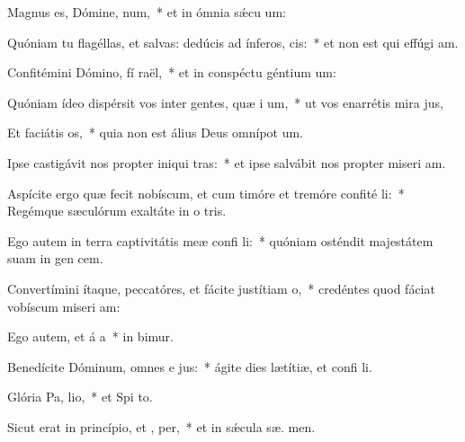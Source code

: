 \item Magnus es, Dómine,  num,~* et in ómnia sǽcu  um:
\item Quóniam tu flagéllas, et salvas: dedúcis ad ínferos,  cis:~* et non est qui effúgi  am.
\item Confitémini Dómino, fí raël,~* et in conspéctu géntium  um:
\item Quóniam ídeo dispérsit vos inter gentes, quæ i um,~* ut vos enarrétis mira jus,
\item Et faciátis  os,~* quia non est álius Deus omnípot  um.
\item Ipse castigávit nos propter iniqui tras:~* et ipse salvábit nos propter miseri am.
\item Aspícite ergo quæ fecit nobíscum, et cum timóre et tremóre confité li:~* Regémque sæculórum exaltáte in o tris.
\item Ego autem in terra captivitátis meæ confi li:~* quóniam osténdit majestátem suam in gen cem.
\item Convertímini ítaque, peccatóres, et fácite justítiam  o,~* credéntes quod fáciat vobíscum miseri am:
\item Ego autem, et á a~* in  bimur.
\item Benedícite Dóminum, omnes e jus:~* ágite dies lætítiæ, et confi li.
\item Glória Pa,  lio,~* et Spi to.
\item Sicut erat in princípio, et ,  per,~* et in sǽcula sæ. men.
